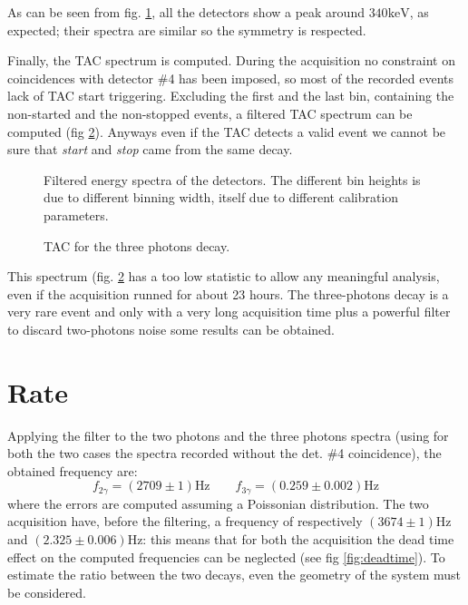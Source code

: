 \documentclass[11pt,a4 paper]{article}
\begin{document}
As can be seen from fig. \ref{fig:alldet:3gamma}, all the detectors show a peak around $340\si{\kilo\electronvolt}$, as expected; their spectra are similar so the symmetry is respected.

Finally, the TAC spectrum is computed. During the acquisition no constraint on coincidences with detector \#4 has been imposed, so most of the recorded events lack of TAC start triggering. Excluding the first and the last bin, containing the non-started and the non-stopped events, a filtered TAC spectrum can be computed (fig \ref{fig:tac:3gamma}).
Anyways even if the TAC detects a valid event we cannot be sure that \emph{start} and \emph{stop} came from the same decay.

\begin{figure}[H]
    \centering
    \caption{Filtered energy spectra of the detectors. The different bin heights is due to different binning width, itself due to different calibration parameters.}
    \label{fig:alldet:3gamma}
\end{figure}

\begin{figure}[H]
    \centering
    \caption{TAC for the three photons decay.}
    \label{fig:tac:3gamma}
\end{figure}


This spectrum (fig. \ref{fig:tac:3gamma} has a too low statistic to allow any meaningful analysis, even if the acquisition runned for about 23 hours. The three-photons decay is a very rare event and only with a very long acquisition time plus a powerful filter to discard two-photons noise some results can be obtained.

\section{Rate}

Applying the filter to the two photons and the three photons spectra (using for both the two cases the spectra recorded without the det. \#4 coincidence), the obtained frequency are:
\begin{equation*}
    f_{2\gamma} = (2709 \pm 1)\si{\hertz} \qquad f_{3\gamma} = (0.259 \pm 0.002)\si{\hertz}
\end{equation*}
where the errors are computed assuming a Poissonian distribution. The two acquisition have, before the filtering, a frequency of respectively $(3674\pm1)\si{\hertz}$ and $(2.325\pm0.006)\si{\hertz}$: this means that for both the acquisition the dead time effect on the computed frequencies can be neglected (see fig \ref{fig:deadtime}). To estimate the ratio between the two decays, even the geometry of the system must be considered.
\end{document}
